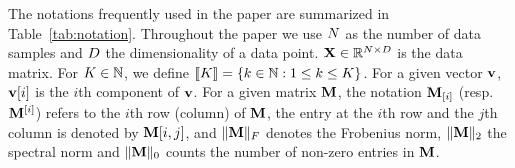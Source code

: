 The notations frequently used in the paper are summarized in Table~\ref{tab:notation}. 
%
Throughout the paper we use $N$ as the number of data samples and $D$ the dimensionality of a data point. 
${\mathbf{X}} \in \mathbb{R}^{N \times D}$ is the data matrix. 
For $K \in {\mathbb{N}}$, we define $\left \llbracket K\right \rrbracket=\left \lbrace k\in {\mathbb{N}}: 1 \leq k \leq K\right \rbrace$.
%
For a given vector ${\mathbf{v}}$, ${\mathbf{v}}[i]$ is the $i$th component of ${\mathbf{v}}$.
%
For a given matrix ${\mathbf{M}}$, the notation ${\mathbf{M}}_{[i]}$ (resp. ${\mathbf{M}}^{[i]}$) refers to the $i$th row (column) of ${\mathbf{M}}$, the entry at the $i$th row and the $j$th column is denoted by ${\mathbf{M}}[i,j]$, and $\|{\mathbf{M}}\|_F$ denotes the Frobenius norm, $\|{\mathbf{M}}\|_2$ the spectral norm and $\|{\mathbf{M}}\|_0$ counts the number of non-zero entries in ${\mathbf{M}}$. 




